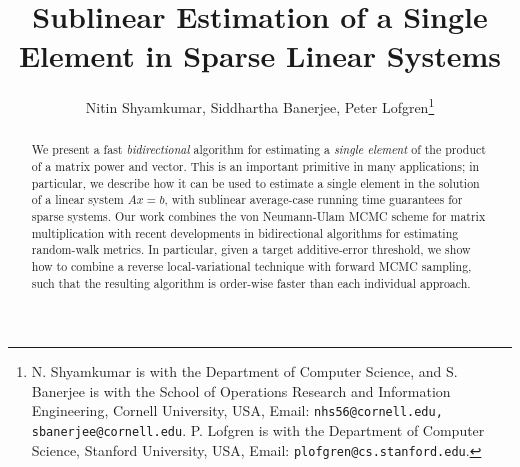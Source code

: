 \documentclass[letterpaper,conference]{ieeeconf}
\begin{document}


\title{Sublinear Estimation of a Single Element in Sparse Linear Systems}


\author{Nitin Shyamkumar, Siddhartha Banerjee, Peter Lofgren\thanks{N. Shyamkumar is with the Department of Computer Science, and S. Banerjee is with the School of Operations Research and Information Engineering, Cornell University, USA, Email: {\tt nhs56@cornell.edu, sbanerjee@cornell.edu}. P. Lofgren is with the Department of Computer Science, Stanford University, USA, Email: {\tt plofgren@cs.stanford.edu}.}}

\maketitle

\begin{abstract}
We present a fast \emph{bidirectional} algorithm for estimating a \emph{single element} of the product of a matrix power and vector.
This is an important primitive in many applications; in particular, we describe how it can be used to estimate a single element in the solution of a linear system $Ax=b$, with sublinear average-case running time guarantees for sparse systems.
Our work combines the von Neumann-Ulam MCMC scheme for matrix multiplication with recent developments in bidirectional
algorithms for estimating random-walk metrics. 
In particular, given a target additive-error threshold, we show how to combine a reverse local-variational technique with forward MCMC sampling, such that the resulting algorithm is order-wise faster than each individual approach.      
\end{abstract}








 
\end{document}
